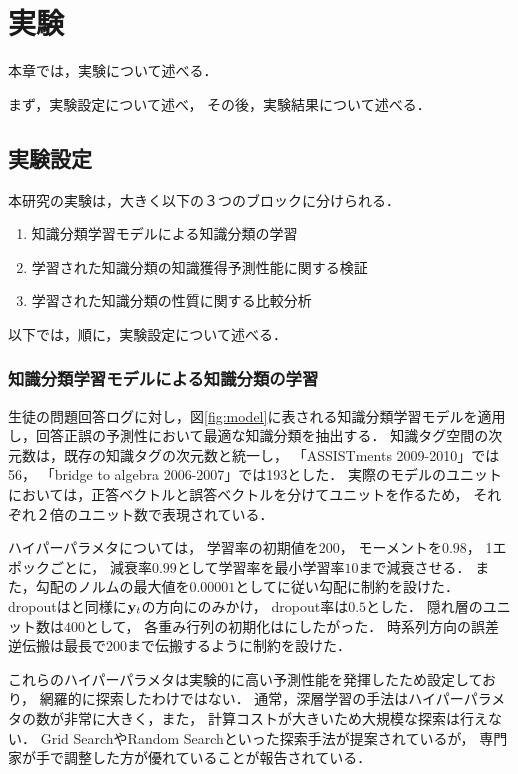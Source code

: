 \chapter{実験}
\label{chap:result}
\fancyhf{}
\rhead{\thepage}
\cfoot{\thepage}


本章では，実験について述べる．

まず，実験設定について述べ，
その後，実験結果について述べる．


\section{実験設定}

本研究の実験は，大きく以下の３つのブロックに分けられる．
\begin{enumerate}
	\item 知識分類学習モデルによる知識分類の学習
	\item 学習された知識分類の知識獲得予測性能に関する検証
	\item 学習された知識分類の性質に関する比較分析
\end{enumerate}
以下では，順に，実験設定について述べる．


\subsection{知識分類学習モデルによる知識分類の学習}
\label{sec:section}
生徒の問題回答ログに対し，図\ref{fig:model}に表される知識分類学習モデルを適用し，回答正誤の予測性において最適な知識分類を抽出する．
知識タグ空間の次元数は，既存の知識タグの次元数と統一し，
「ASSISTments 2009-2010」では56，
「bridge to algebra 2006-2007」では193とした．
実際のモデルのユニットにおいては，正答ベクトルと誤答ベクトルを分けてユニットを作るため，
それぞれ２倍のユニット数で表現されている．

ハイパーパラメタについては，
学習率の初期値を$200$，
モーメントを$0.98$，
1エポックごとに，
減衰率$0.99$として学習率を最小学習率$10$まで減衰させる．
また，勾配のノルムの最大値を$0.00001$として\cite{pascanu2013difficulty}に従い勾配に制約を設けた．
dropoutは\cite{piech2015deep}と同様に${\bf y}_t$の方向にのみかけ，
dropout率は$0.5$とした．
隠れ層のユニット数は$400$として，
各重み行列の初期化は\cite{glorot2010understanding}にしたがった．
時系列方向の誤差逆伝搬は最長で$200$まで伝搬するように制約を設けた．

これらのハイパーパラメタは実験的に高い予測性能を発揮したため設定しており，
網羅的に探索したわけではない．
通常，深層学習の手法はハイパーパラメタの数が非常に大きく，また，
計算コストが大きいため大規模な探索は行えない．
Grid SearchやRandom Search\cite{bergstra2012random}といった探索手法が提案されているが，
専門家が手で調整した方が優れていることが報告されている\cite{larochelle2007empirical, bergstra2012random}．

